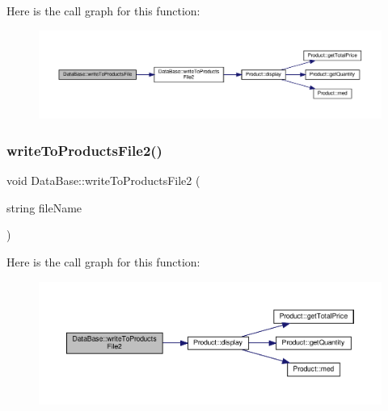 Here is the call graph for this function\+:\nopagebreak
\begin{figure}[H]
\begin{center}
\leavevmode
\includegraphics[width=350pt]{classDataBase_a108ba0eb315d14ed6bc7181b98499318_cgraph}
\end{center}
\end{figure}
\mbox{\label{classDataBase_aec542d0eb4b2c2d44abe5cefd25d2057}} 
\subsubsection{\texorpdfstring{write\+To\+Products\+File2()}{writeToProductsFile2()}}
{\footnotesize\ttfamily void Data\+Base\+::write\+To\+Products\+File2 (\begin{DoxyParamCaption}\item[{string}]{file\+Name }\end{DoxyParamCaption})\hspace{0.3cm}{\ttfamily [inline]}}

Here is the call graph for this function\+:\nopagebreak
\begin{figure}[H]
\begin{center}
\leavevmode
\includegraphics[width=350pt]{classDataBase_aec542d0eb4b2c2d44abe5cefd25d2057_cgraph}
\end{center}
\end{figure}
\mbox{\label{classDataBase_a0bf85b7fb0feb4fb1f6888ba58ebe2b2}} 
